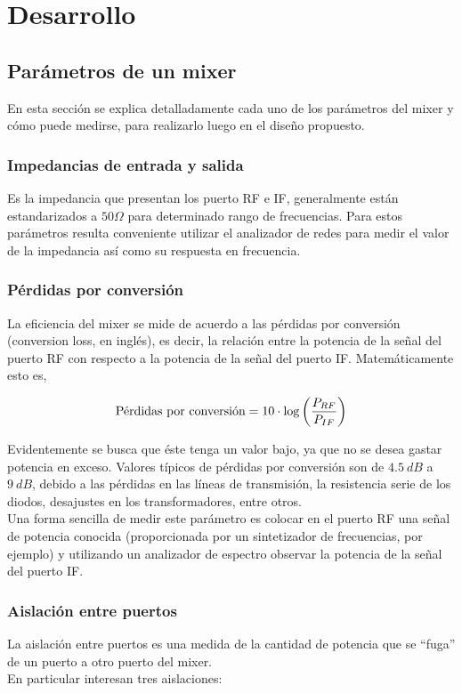 \documentclass[a4paper,10pt]{article}
\begin{document}
\newpage
\section{Desarrollo}
	\subsection{Parámetros de un mixer}
	\indent En esta secci\'on se explica detalladamente cada uno de los 
	par\'ametros del mixer y c\'omo puede medirse, para realizarlo luego en el 
	dise\~no propuesto.
	
	\subsubsection{Impedancias de entrada y salida}
	\indent Es la impedancia que presentan los puerto RF e IF, generalmente 
	est\'an estandarizados a $50\Omega$ para determinado rango de frecuencias. 
	Para estos par\'ametros resulta conveniente utilizar el analizador de redes 
	para medir el valor de la impedancia as\'i como su respuesta en frecuencia.
	
	\subsubsection{P\'erdidas por conversi\'on}
	\indent La eficiencia del mixer se mide de acuerdo a las p\'erdidas por 
	conversi\'on (conversion loss, en ingl\'es), es decir, la relación entre la 
	potencia de la señal del puerto RF con respecto a la potencia de la señal 
	del puerto IF. Matem\'aticamente esto es,
		
	$$\textmd{P\'erdidas por conversi\'on}=10\cdot\log\left(
	\frac{P_{RF}}{P_{IF}}\right)$$
		
	\indent Evidentemente se busca que \'este tenga un valor bajo, ya que no se 
	desea gastar potencia en exceso. Valores t\'ipicos de p\'erdidas por 
	conversi\'on son de $4.5~dB$ a $9~dB$, debido a las p\'erdidas en las 
	l\'ineas de transmisi\'on, la resistencia serie de los diodos, desajustes en
	los transformadores, entre otros. \\
	\indent Una forma sencilla de medir este par\'ametro es colocar en el puerto
	RF una señal de potencia conocida (proporcionada por un sintetizador de 
	frecuencias, por ejemplo) y utilizando un analizador de espectro observar la
	potencia de la señal del puerto IF.
		
	\subsubsection{Aislación entre puertos}
	\indent La aislación entre puertos es una medida de la cantidad de potencia 
	que se ``fuga'' de un puerto a otro puerto del mixer. \\
	\indent En particular interesan tres aislaciones:
\end{document}
